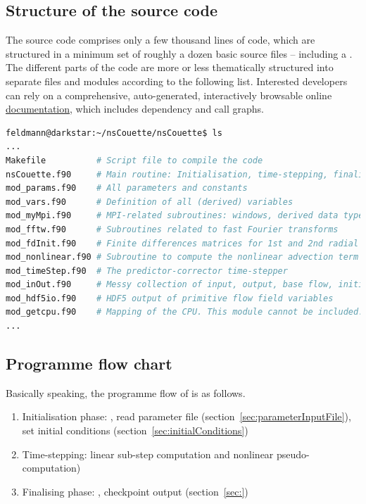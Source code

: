 \documentclass[a4paper, 11pt, DIV=11]{scrartcl}
\begin{document}

\subsection{Structure of the source code}
\label{sec:codeStructures}

The source code comprises only a few thousand lines of code, which are structured in
a minimum set of roughly a dozen basic source files -- including a .
The different parts of the code are more or less thematically structured into
separate files and \fortran modules according to the following list. Interested
developers can rely on a comprehensive, auto-generated, interactively browsable
online \href{http://mjr.pages.mpcdf.de/nscouette/ford-doc/}{ documentation},
which includes dependency and call graphs.
\begin{lstlisting}[language=bash]
feldmann@darkstar:~/nsCouette/nsCouette$ ls
...
Makefile          # Script file to compile the code
nsCouette.f90     # Main routine: Initialisation, time-stepping, finalisation
mod_params.f90    # All parameters and constants
mod_vars.f90      # Definition of all (derived) variables
mod_myMpi.f90     # MPI-related subroutines: windows, derived data types, etc.
mod_fftw.f90      # Subroutines related to fast Fourier transforms
mod_fdInit.f90    # Finite differences matrices for 1st and 2nd radial derivatives
mod_nonlinear.f90 # Subroutine to compute the nonlinear advection term (pseudo-spectral)
mod_timeStep.f90  # The predictor-corrector time-stepper
mod_inOut.f90     # Messy collection of input, output, base flow, initial conditions etc.
mod_hdf5io.f90    # HDF5 output of primitive flow field variables
mod_getcpu.f90    # Mapping of the CPU. This module cannot be included.
...
\end{lstlisting}



\subsection{Programme flow chart}
\label{sec:programmeFlowChart}

Basically speaking, the programme flow of \nsc is as follows.
\begin{enumerate}
\item Initialisation phase: \mpi, read parameter file (section~\ref{sec:parameterInputFile}), set initial conditions (section~\ref{sec:initialConditions})
\item Time-stepping: linear sub-step computation and nonlinear pseudo-computation)
\item Finalising phase: \mpi, checkpoint output (section~\ref{sec:})
\end{enumerate}
\end{document}
